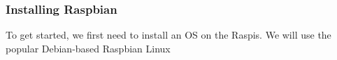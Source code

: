 








\subsubsection{Installing Raspbian}

To get started, we first need to install an \ac{OS} on the
\ac{Raspi}s. We will use the popular Debian-based Raspbian
Linux~\cite{raspbian}

